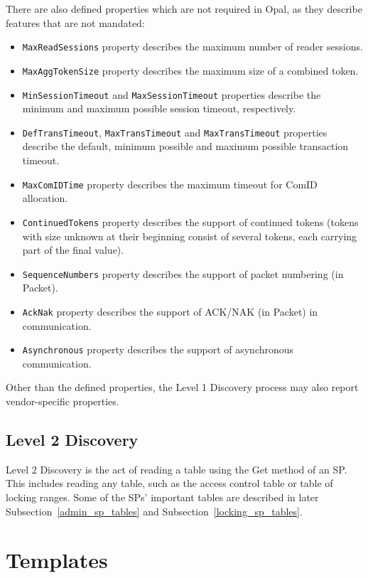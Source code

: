 There are also defined properties which are not required in Opal, as they describe features that are not mandated:
\begin{itemize}
\item \verb|MaxReadSessions| property describes the maximum number of reader sessions.
\item \verb|MaxAggTokenSize| property describes the maximum size of a combined token.
\item \verb|MinSessionTimeout| and \verb|MaxSessionTimeout| properties describe the minimum and maximum possible session timeout, respectively.
\item \verb|DefTransTimeout|, \verb|MaxTransTimeout| and \verb|MaxTransTimeout| properties describe the default, minimum possible and maximum possible transaction timeout.
\item \verb|MaxComIDTime| property describes the maximum timeout for ComID allocation.
\item \verb|ContinuedTokens| property describes the support of continued tokens (tokens with size unknown at their beginning consist of several tokens, each carrying part of the final value).
\item \verb|SequenceNumbers| property describes the support of packet numbering (in Packet).
\item \verb|AckNak| property describes the support of ACK/NAK (in Packet) in communication.
\item \verb|Asynchronous| property describes the support of asynchronous communication.
\end{itemize}

Other than the defined properties, the Level 1 Discovery process may also report vendor-specific properties.

\subsection{Level 2 Discovery}

Level 2 Discovery is the act of reading a table using the Get method of an SP. This includes reading any table, such as the access control table or table of locking ranges. Some of the SPs' important tables are described in later Subsection~\ref{admin_sp_tables} and Subsection~\ref{locking_sp_tables}.


\section{Templates}
\label{templates}

